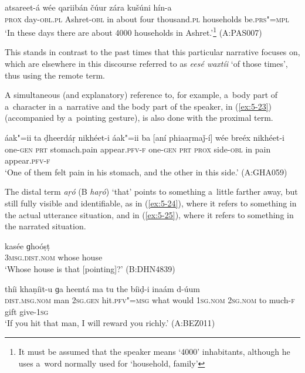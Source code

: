 \begin{exe}
\ex
\label{ex:5-22}
 atsareet-á wée qariibán čúur zára kušúni
hín-a \\
\textsc{prox} day-\textsc{obl.pl} Ashret-\textsc{obl} in about four thousand.\textsc{pl} households
be.\textsc{prs"=mpl} \\
\glt `In these days there are about 4000 households in Ashret.'\footnote{It must be assumed that the speaker means `4000' inhabitants, although he uses a~word normally used for `household, family'} (A:PAS007)
\end{exe}
This stands in contrast to the past times that this particular narrative focuses on, which are elsewhere in this discourse referred to as \textit{eesé waxtíi} `of those times', thus using the remote term.

A simultaneous (and explanatory) reference to, for example, a~body part of a~character in a~narrative and the body part of the speaker, in (\ref{ex:5-23}) (accompanied by a~pointing gesture), is also done with the proximal term.


\begin{exe}
\ex
\label{ex:5-23}
\gll áak"=ii ta ḍheerdáṛ nikhéet-i áak"=ii ba [aní phiaaṛmaǰ-í] wée
breéx nikhéet-i \\
one-\textsc{gen} \textsc{prt} stomach.pain appear.\textsc{pfv-f} one-\textsc{gen} \textsc{prt}
\textsc{prox} side-\textsc{obl} in pain appear.\textsc{pfv-f} \\
\glt `One of them felt pain in his stomach, and the other in this side.' (A:GHA059)
\end{exe}
The distal term \textit{aṛó} (B \textit{haṛó}) `that' points to something a~little farther away, but still fully visible and identifiable, as in (\ref{ex:5-24}), where it refers to something in the actual utterance situation, and in (\ref{ex:5-25}), where it refers to something in the narrated situation. 

\begin{exe}
\ex
\label{ex:5-24}
\gll [haṛó] kasée ɡhoóṣṭ \\
\textsc{3msg.dist.nom} whose house \\
\glt `Whose house is that [pointing]?' (B:DHN4839)

\ex
\label{ex:5-25}
 thíi khaṇíit-u ɡa heentá ma tu the bíiḍ-i inaám d-úum \\
\textsc{dist.msg.nom} man \textsc{2sg.gen} hit.\textsc{pfv"=msg} what would \textsc{1}\textsc{sg.nom} 
\textsc{2sg.nom} to much-\textsc{f} gift give-\textsc{1}\textsc{sg} \\
\glt `If you hit that man, I will reward you richly.' (A:BEZ011)
\end{exe}

